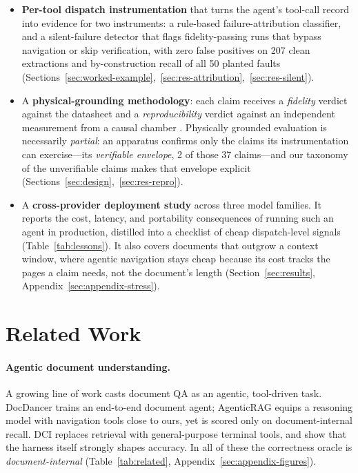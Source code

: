 \documentclass[11pt]{article}
\begin{document}
\begin{itemize}
\item \textbf{Per-tool dispatch instrumentation} that turns the agent's
tool-call record into evidence for two instruments: a rule-based
failure-attribution classifier, and a silent-failure detector that flags
fidelity-passing runs that bypass navigation or skip verification, with
zero false positives on 207 clean extractions and by-construction recall
of all 50 planted faults
(Sections~\ref{sec:worked-example},~\ref{sec:res-attribution},~\ref{sec:res-silent}).
\item A \textbf{physical-grounding methodology}: each claim receives a
\emph{fidelity} verdict against the datasheet and a \emph{reproducibility}
verdict against an independent measurement from a causal chamber
\citep{gamella2025chambers}. Physically grounded evaluation is
necessarily \emph{partial}: an apparatus confirms only the claims its
instrumentation can exercise---its \emph{verifiable envelope}, 2 of those
37 claims---and our taxonomy of the unverifiable claims makes that
envelope explicit (Sections~\ref{sec:design},~\ref{sec:res-repro}).
\item A \textbf{cross-provider deployment study} across three model
families. It reports the cost, latency, and portability consequences of
running such an agent in production, distilled into a checklist of
cheap dispatch-level signals (Table~\ref{tab:lessons}). It also covers
documents that outgrow a context window, where agentic navigation stays
cheap because its cost tracks the pages a claim needs, not the
document's length (Section~\ref{sec:results},
Appendix~\ref{sec:appendix-stress}).
\end{itemize}

\section{Related Work}
\label{sec:related}

\paragraph{Agentic document understanding.}
A growing line of work casts document QA as an agentic, tool-driven
task. DocDancer \citep{zhang2026docdancer} trains an end-to-end document
agent; AgenticRAG \citep{suresh2026agenticrag} equips a reasoning model with
navigation tools close to ours, yet is scored only on document-internal
recall. DCI \citep{li2026dci} replaces retrieval with general-purpose
terminal tools, and \citet{sen2026grep} show that the harness itself
strongly shapes accuracy. In all of these the correctness
oracle is \emph{document-internal}
(Table~\ref{tab:related}, Appendix~\ref{sec:appendix-figures}).
\end{document}
